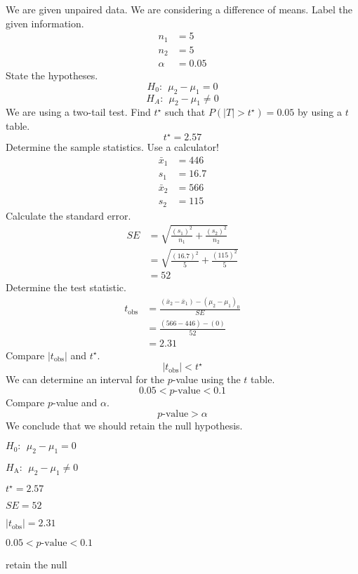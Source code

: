 \begin{solution}
We are given unpaired data. We are considering a difference of means.
Label the given information. \[
\begin{aligned}
n_1 &= 5 \\
n_2 &= 5 \\
\alpha &= 0.05
\end{aligned}
\] State the hypotheses. \[H_0:~~\mu_2-\mu_1 = 0\]
\[H_A:~~\mu_2-\mu_1 \ne 0\] We are using a two-tail test. Find
\(t^{\star}\) such that \(P(|T|>t^{\star})=0.05\) by using a \(t\)
table. \[t^{\star} = 2.57\] Determine the sample statistics. Use a
calculator! \[
\begin{aligned}
\bar{x}_1 &= 446 \\
s_1 &= 16.7 \\
\bar{x}_2 &= 566 \\
s_2 &= 115
\end{aligned}
\] Calculate the standard error. \[
\begin{aligned}
SE &= \sqrt{\frac{(s_1)^2}{n_1}+\frac{(s_2)^2}{n_2}} \\
&= \sqrt{\frac{(16.7)^2}{5}+\frac{(115)^2}{5}} \\
&= 52
\end{aligned}
\] Determine the test statistic. \[
\begin{aligned}
t_\text{obs} &= \frac{(\bar{x}_2-\bar{x}_1)-(\mu_2-\mu_1)_0}{SE} \\
&= \frac{(566-446)-(0)}{52} \\
&= 2.31
\end{aligned}
\] Compare \(|t_\text{obs}|\) and \(t^\star\).
\[|t_\text{obs}| < t^\star \] We can determine an interval for the
\(p\)-value using the \(t\) table. \[0.05 < p\text{-value} < 0.1\]
Compare \(p\)-value and \(\alpha\). \[p\text{-value} > \alpha \] We
conclude that we should retain the null hypothesis.
\begin{answerlist}
  \item \(H_0: ~~\mu_2-\mu_1=0\)
  \item \(H_\text{A}:~~ \mu_2-\mu_1\ne 0\)
  \item \(t^\star = 2.57\)
  \item \(SE = 52\)
  \item \(|t_\text{obs}| = 2.31\)
  \item \(0.05 < p\text{-value} < 0.1\)
  \item retain the null
\end{answerlist}
\end{solution}

